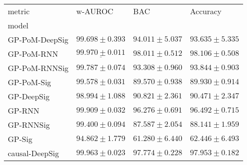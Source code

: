 
\robustify\bfseries

\begin{tabular}{llll}
\toprule
metric &                                        {w-AUROC} &                                            BAC &                                       Accuracy \\
model          &                                                &                                                &                                                \\
\midrule
GP-PoM-DeepSig &                           $ 99.698 \pm 0.393 $ &                           $ 94.011 \pm 5.037 $ &                           $ 93.635 \pm 5.335 $ \\
GP-PoM-RNN     &            $  \underline{ 99.970 \pm 0.011 } $ &                           $ 98.011 \pm 0.512 $ &                           $ 98.106 \pm 0.508 $ \\
GP-PoM-RNNSig  &                           $ 99.787 \pm 0.074 $ &                           $ 93.308 \pm 0.960 $ &                           $ 93.844 \pm 0.903 $ \\
GP-PoM-Sig     &                           $ 99.578 \pm 0.031 $ &                           $ 89.570 \pm 0.938 $ &                           $ 89.930 \pm 0.914 $ \\
\midrule
GP-DeepSig     &                           $ 98.994 \pm 1.088 $ &                           $ 90.821 \pm 2.361 $ &                           $ 90.471 \pm 2.347 $ \\
GP-RNN         &                           $ 99.909 \pm 0.032 $ &                           $ 96.276 \pm 0.691 $ &                           $ 96.492 \pm 0.715 $ \\
GP-RNNSig      &                           $ 99.400 \pm 0.094 $ &                           $ 87.587 \pm 2.054 $ &                           $ 88.141 \pm 1.959 $ \\
GP-Sig         &                           $ 94.862 \pm 1.779 $ &                           $ 61.280 \pm 6.440 $ &                           $ 62.446 \pm 6.493 $ \\
\midrule
causal-DeepSig &                           $ 99.963 \pm 0.023 $ &                           $ 97.774 \pm 0.228 $ &                           $ 97.953 \pm 0.182 $ \\

\end{tabular}
